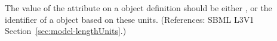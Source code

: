 The value of the  attribute on a \Model object
definition should be either ,  or the
identifier of a \UnitDefinition object based on these units.  (References:
SBML L3V1 Section~\ref{sec:model-lengthUnits}.)

